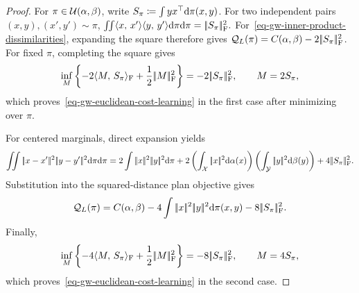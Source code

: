 \begin{proof}
For $\pi\in\mathcal{U}(\alpha,\beta)$, write $S_\pi\coloneqq\int yx^\top\mathrm{d}\pi(x,y)$.
For two independent pairs $(x,y),(x',y')\sim\pi$, \(\iint\langle x,\,x'\rangle\langle y,\,y'\rangle\mathrm{d}\pi\mathrm{d}\pi = |\!| S_\pi |\!|_{\mathrm F}^2.\)
For~\eqref{eq-gw-inner-product-dissimilarities}, expanding the square therefore gives $\mathcal Q_L(\pi)=C(\alpha,\beta)-2|\!| S_\pi |\!|_{\mathrm F}^2$. For fixed $\pi$, completing the square gives
\[
\inf_M
\left\{-2\langle M,\,S_\pi\rangle_{\mathrm F}+\frac12|\!| M |\!|_{\mathrm F}^2\right\}
=-2|\!| S_\pi |\!|_{\mathrm F}^2,
\qquad M=2S_\pi,
\]
which proves~\eqref{eq-gw-euclidean-cost-learning} in the first case after minimizing over $\pi$.

For centered marginals, direct expansion yields
\[
\iint\norm{x-x'}^2\norm{y-y'}^2\d\pi\d\pi
=
2\int\norm{x}^2\norm{y}^2\d\pi
+2
\left(\int_\X\norm{x}^2\d\alpha(x)\right)
\left(\int_\Y\norm{y}^2\d\beta(y)\right)
+4\norm{S_\pi}_{\mathrm F}^2.
\]
Substitution into the squared-distance plan objective gives
\begin{equation}\label{eq-gw-squared-distance-cost-regularization}
\mathcal Q_L(\pi)
=
C(\alpha,\beta)
-4\int|\!| x |\!|^2|\!| y |\!|^2\mathrm{d}\pi(x,y)
-8|\!| S_\pi |\!|_{\mathrm F}^2.
\end{equation}
Finally,
\[
\inf_M
\left\{-4\langle M,\,S_\pi\rangle_{\mathrm F}+\frac12|\!| M |\!|_{\mathrm F}^2\right\}
=-8|\!| S_\pi |\!|_{\mathrm F}^2,
\qquad M=4S_\pi,
\]
which proves~\eqref{eq-gw-euclidean-cost-learning} in the second case.
\end{proof}
